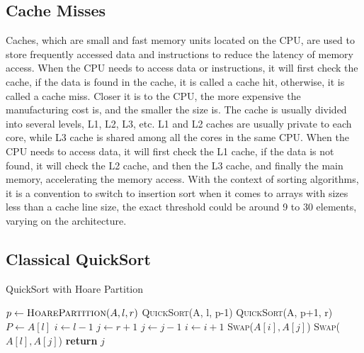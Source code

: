 \documentclass[a4paper,oneside,12pt]{book}
\begin{document}
\subsection{Cache Misses}
Caches, which are small and fast memory units located on the CPU, are used to store frequently accessed data and instructions to reduce the latency of memory access.
When the CPU needs to access data or instructions, it will first check the cache, if the data is found in the cache, it is called a cache hit, otherwise, it is called a cache miss.
Closer it is to the CPU, the more expensive the manufacturing cost is, and the smaller the size is. The cache is usually divided into several levels, L1, L2, L3, etc.
L1 and L2 caches are usually private to each core, while L3 cache is shared among all the cores in the same CPU.
When the CPU needs to access data, it will first check the L1 cache, if the data is not found, it will check the L2 cache, and then the L3 cache, and finally the main memory, accelerating the memory access.
With the context of sorting algorithms, it is a convention to switch to insertion sort when it comes to arrays with sizes less than a cache line size, the exact threshold could be around 9 to 30 elements, varying on the architecture.

\subsection{Classical QuickSort}
\begin{algorithm}[H]
    \caption{QuickSort with Hoare Partition}\label{HoarePartition}
    \begin{algorithmic}[1]
        \State $p \gets \textsc{HoarePartition}(A, l, r)$
        \State \textsc{QuickSort}(A, l, p-1)
        \State \textsc{QuickSort}(A, p+1, r)
        \EndIf
        \EndProcedure
        \State $P \gets A[l]$ 
        \State $i \gets l - 1$
        \State $j \gets r + 1$
        \Repeat
        \State $j \gets j - 1$
        \Repeat
        \State $i \gets i + 1$
        \State \textsc{Swap}($A[i], A[j]$)
        \EndWhile
        \State \textsc{Swap}($A[l], A[j]$) 
        \State \textbf{return} $j$
        \EndProcedure
    \end{algorithmic}
\end{algorithm}
\end{document}
